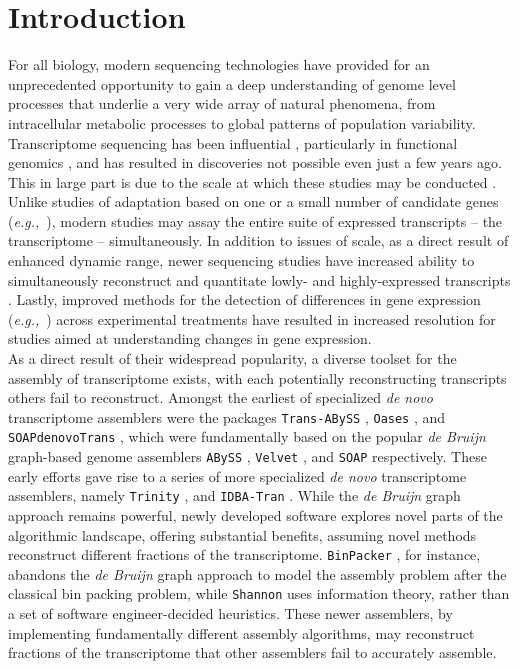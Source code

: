 \documentclass[10pt,letterpaper]{article}
\newcommand{\tit}{\textit}
\newcommand{\eg}{\textit{e.g.,}}
\begin{document}
\section{Introduction}

For all biology, modern sequencing technologies have provided for an unprecedented opportunity to gain a deep understanding of genome level processes that underlie a very wide array of natural phenomena, from intracellular metabolic processes to global patterns of population variability. Transcriptome sequencing has been influential \citep{Mortazavi:2008jj,Wang:2009di}, particularly in functional genomics \citep{Lappalainen:2013el,Cahoy:2008hm}, and has resulted in discoveries not possible even just a few years ago. This in large part is due to the scale at which these studies may be conducted \citep{Li:2017bq, Tan:2017ix}. Unlike studies of adaptation based on one or a small number of candidate genes (\eg\ \citep{Fitzpatrick:2005vd,Panhuis:2006kp}), modern studies may assay the entire suite of expressed transcripts -- the transcriptome -- simultaneously. In addition to issues of scale, as a direct result of enhanced dynamic range, newer sequencing studies have increased ability to simultaneously reconstruct and quantitate lowly- and highly-expressed transcripts \citep{Wolf:2013hd,Vijay:2012gy}. Lastly, improved methods for the detection of differences in gene expression (\eg\ \citep{Robinson:2010cw,Love:2014cf}) across experimental treatments have resulted in increased resolution for studies aimed at understanding changes in gene expression.    \\

As a direct result of their widespread popularity, a diverse toolset for the assembly of transcriptome exists, with each potentially reconstructing transcripts others fail to reconstruct. Amongst the earliest of specialized \tit{de novo} transcriptome assemblers were the packages \texttt{Trans-ABySS} \citep{Robertson:2010ih}, \texttt{Oases} \citep{Schulz:2012je}, and \texttt{SOAPdenovoTrans} \citep{Xie:2013wu}, which were fundamentally based on the popular \tit{de Bruijn} graph-based genome assemblers \texttt{ABySS} \citep{Simpson:2009iv}, \texttt{Velvet} \citep{Zerbino:2008bm}, and \texttt{SOAP} \cite{Li:2008in} respectively. These early efforts gave rise to a series of more specialized \tit{de novo} transcriptome assemblers, namely \texttt{Trinity} \citep{Haas:2013jq}, and \texttt{IDBA-Tran} \citep{Peng:2013eu}. While the \tit{de Bruijn} graph approach remains powerful, newly developed software explores novel parts of the algorithmic landscape, offering substantial benefits, assuming novel methods reconstruct different fractions of the transcriptome. \texttt{BinPacker} \citep{Liu:2016hh}, for instance, abandons the \tit{de Bruijn} graph approach to model the assembly problem after the classical bin packing problem, while \texttt{Shannon} \citep{Kannan:2016be} uses information theory, rather than a set of software engineer-decided heuristics. These newer assemblers, by implementing fundamentally different assembly algorithms, may reconstruct  fractions of the transcriptome that other assemblers fail to accurately assemble. 
\end{document}
